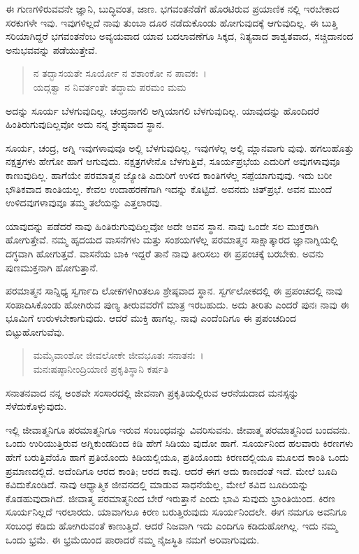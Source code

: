 ಈ ಗುಣಗಳಿರುವವನೇ ಜ್ಞಾನಿ, ಬುದ್ಧಿವಂತ, ಜಾಣ. ಭಗವಂತನೆಡೆಗೆ ಹೊರಟಿರುವ ಪ್ರಯಾಣಿಕ ನಲ್ಲಿ ಇರಬೇಕಾದ ಸರಕುಗಳೇ ಇವು. ಇವುಗಳಿಲ್ಲದೆ ನಾವು ತುಂಬಾ ದೂರ ನಡೆದುಕೊಂಡು ಹೋಗುವುದಕ್ಕೆ ಆಗುವುದಿಲ್ಲ. ಈ ಬುತ್ತಿ ಸರಿಯಾಗಿದ್ದರೆ ಭಗವಂತನೆಂಬ ಅವ್ಯಯವಾದ ಯಾವ ಬದಲಾವಣೆಗೂ ಸಿಕ್ಕದ, ನಿತ್ಯವಾದ ಶಾಶ್ವತವಾದ, ಸಚ್ಚಿದಾನಂದ ಅನುಭವವನ್ನು ಪಡೆಯುತ್ತೇವೆ.

\begin{verse}
ನ ತದ್ಭಾಸಯತೇ ಸೂರ್ಯೋ ನ ಶಶಾಂಕೋ ನ ಪಾವಕಃ~।\\ಯದ್ಗತ್ವಾ ನ ನಿವರ್ತಂತೇ ತದ್ಧಾಮ ಪರಮಂ ಮಮ 
\end{verse}

{\small ಅದನ್ನು ಸೂರ್ಯ ಬೆಳಗುವುದಿಲ್ಲ. ಚಂದ್ರನಾಗಲಿ ಅಗ್ನಿಯಾಗಲಿ ಬೆಳಗುವುದಿಲ್ಲ. ಯಾವುದನ್ನು ಹೊಂದಿದರೆ ಹಿಂತಿರುಗುವುದಿಲ್ಲವೋ ಅದು ನನ್ನ ಶ್ರೇಷ್ಠವಾದ ಸ್ಥಾನ.}

ಸೂರ್ಯ, ಚಂದ್ರ, ಅಗ್ನಿ ಇವುಗಳಾವುವೂ ಅಲ್ಲಿ ಬೆಳಗುವುದಿಲ್ಲ. ಇವುಗಳೆಲ್ಲ ಅಲ್ಲಿ ಮ್ಲಾನವಾಗು ವುವು. ಹಗಲುಹೊತ್ತು ನಕ್ಷತ್ರಗಳು ಹೇಗೋ ಹಾಗೆ ಆಗುವುದು. ನಕ್ಷತ್ರಗಳೇನೊ ಬೆಳಗುತ್ತಿವೆ, ಸೂರ್ಯಪ್ರಭೆಯ ಎದುರಿಗೆ ಅವುಗಳಾವುವೂ ಕಾಣುವುದಿಲ್ಲ. ಹಾಗೆಯೇ ಪರಮಾತ್ಮನ ಜ್ಯೋತಿ ಎದುರಿಗೆ ಉಳಿದ ಕಾಂತಿಗಳೆಲ್ಲ ಸಪ್ಪೆಯಾಗುವುವು. ಇದು ಬರೀ ಭೌತಿಕವಾದ ಕಾಂತಿಯಲ್ಲ. ಕೇವಲ ಉದಾಹರಣೆಗಾಗಿ ಇದನ್ನು ಕೊಟ್ಟಿದೆ. ಅವನದು ಚಿತ್​ಪ್ರಭೆ. ಅವನ ಮುಂದೆ ಉಳಿದವುಗಳಾವುವೂ ತಮ್ಮ ತಲೆಯನ್ನು ಎತ್ತಲಾರವು.

ಯಾವುದನ್ನು ಪಡೆದರೆ ನಾವು ಹಿಂತಿರುಗುವುದಿಲ್ಲವೋ ಅದೇ ಅವನ ಸ್ಥಾನ. ನಾವು ಒಂದೇ ಸಲ ಮುಕ್ತರಾಗಿ ಹೋಗುತ್ತೇವೆ. ನಮ್ಮ ಹೃದಯದ ವಾಸನೆಗಳು ಮತ್ತು ಸಂಶಯಗಳೆಲ್ಲ ಪರಮಾತ್ಮನ ಸಾಕ್ಷಾತ್ಕಾರದ ಜ್ಞಾನಾಗ್ನಿಯಲ್ಲಿ ದಗ್ಧವಾಗಿ ಹೋಗುತ್ತವೆ. ವಾಸನೆಯ ಬಾಕಿ ಇದ್ದರೆ ತಾನೆ ನಾವು ತೀರಿಸಲು ಈ ಪ್ರಪಂಚಕ್ಕೆ ಬರಬೇಕು. ಅವನು ಪುಣಮುಕ್ತನಾಗಿ ಹೋಗುತ್ತಾನೆ.

ಪರಮಾತ್ಮನ ಸಾನ್ನಿಧ್ಯ ಸ್ವರ್ಗಾದಿ ಲೋಕಗಳಿಗಿಂತಲೂ ಶ್ರೇಷ್ಠವಾದ ಸ್ಥಾನ. ಸ್ವರ್ಗಲೋಕದಲ್ಲಿ ಈ ಪ್ರಪಂಚದಲ್ಲಿ ನಾವು ಸಂಪಾದಿಸಿಕೊಂಡು ಹೋಗಿರುವ ಪುಣ್ಯ ತೀರುವವರೆಗೆ ಮಾತ್ರ ಇರಬಹುದು. ಅದು ತೀರಿತು ಎಂದರೆ ಪುನಃ ನಾವು ಈ ಭೂಮಿಗೆ ಉರುಳಬೇಕಾಗುವುದು. ಆದರೆ ಮುಕ್ತಿ ಹಾಗಲ್ಲ. ನಾವು ಎಂದೆಂದಿಗೂ ಈ ಪ್ರಪಂಚದಿಂದ ಬಿಟ್ಟುಹೋಗುವೆವು.

\begin{verse}
ಮಮೈವಾಂಶೋ ಜೀವಲೋಕೇ ಜೀವಭೂತಃ ಸನಾತನಃ~।\\ಮನಃಷಷ್ಠಾನೀಂದ್ರಿಯಾಣಿ ಪ್ರಕೃತಿಸ್ಥಾನಿ ಕರ್ಷತಿ 
\end{verse}

{\small ಸನಾತನವಾದ ನನ್ನ ಅಂಶವೇ ಸಂಸಾರದಲ್ಲಿ ಜೀವನಾಗಿ ಪ್ರಕೃತಿಯಲ್ಲಿರುವ ಆರನೆಯದಾದ ಮನಸ್ಸನ್ನು ಸೆಳೆದುಕೊಳ್ಳುವುದು.}

ಇಲ್ಲಿ ಜೀವಾತ್ಮನಿಗೂ ಪರಮಾತ್ಮನಿಗೂ ಇರುವ ಸಂಬಂಧವನ್ನು ವಿವರಿಸುವನು. ಜೀವಾತ್ಮ ಪರಮಾತ್ಮನಿಂದ ಬಂದವನು. ಒಂದು ಉರಿಯುತ್ತಿರುವ ಅಗ್ನಿಕುಂಡದಿಂದ ಕಿಡಿ ಹೇಗೆ ಸಿಡಿಯು ವುದೋ ಹಾಗೆ. ಸೂರ್ಯನಿಂದ ಹಲವಾರು ಕಿರಣಗಳು ಹೇಗೆ ಬರುತ್ತಿವೆಯೊ ಹಾಗೆ ಪ್ರತಿಯೊಂದು ಕಿಡಿಯಲ್ಲಿಯೂ, ಪ್ರತಿಯೊಂದು ಕಿರಣದಲ್ಲಿಯೂ ಮೂಲದ ಕಾಂತಿ ಒಂದು ಪ್ರಮಾಣದಲ್ಲಿದೆ. ಅದೆಂದಿಗೂ ಆರದ ಕಾಂತಿ; ಆರದ ಕಾವು. ಆದರೆ ಈಗ ಅದು ಕಾಣದಂತೆ ಇದೆ. ಮೇಲೆ ಬೂದಿ ಕವಿದುಕೊಂಡಿದೆ. ನಾವು ಆಧ್ಯಾತ್ಮಿಕ ಜೀವನದಲ್ಲಿ ಮಾಡುವ ಸಾಧನೆಯೆಲ್ಲ, ಮೇಲೆ ಕವಿದ ಬೂದಿಯನ್ನು ಕೊಡಹುವುದಾಗಿದೆ. ಜೀವಾತ್ಮ ಪರಮಾತ್ಮನಿಂದ ಬೇರೆ ಇರುತ್ತಾನೆ ಎಂದು ಭಾವಿ ಸುವುದು ಭ್ರಾಂತಿಯಿಂದ. ಕಿರಣ ಸೂರ್ಯನಿಲ್ಲದೆ ಇರಲಾರದು. ಯಾವಾಗಲೂ ಕಿರಣ ಬರುತ್ತಿರುವುದು ಸೂರ್ಯನಿಂದಲೇ. ಈಗ ನಮಗೂ ಅವನಿಗೂ ಸಂಬಂಧ ಕಡಿದು ಹೋಗಿರುವಂತೆ ಕಾಣುತ್ತಿದೆ. ಆದರೆ ನಿಜವಾಗಿ ಇದು ಎಂದಿಗೂ ಕಡಿದುಹೋಗಿಲ್ಲ. ಇದು ನಮ್ಮ ಒಂದು ಭ್ರಮೆ. ಈ ಭ್ರಮೆಯಿಂದ ಪಾರಾದರೆ ನಮ್ಮ ನೈಜಸ್ಥಿತಿ ನಮಗೆ ಅರಿವಾಗುವುದು.

